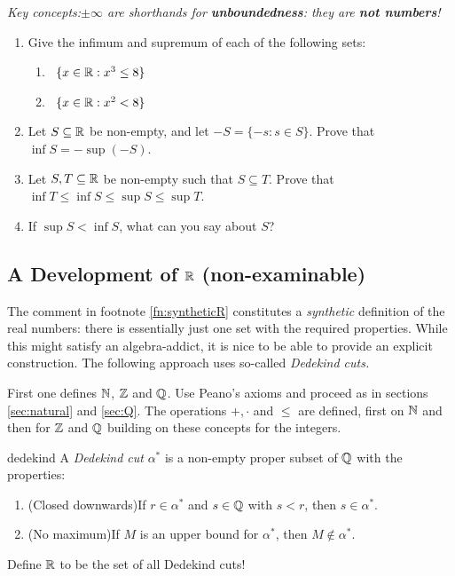 \begin{exercises}{}{}
	\emph{Key concepts:\quad $\pm\infty$ are shorthands for \textbf{unboundedness}: they are \textbf{not numbers}!}
	
	\begin{enumerate}
	  \item Give the infimum and supremum of each of the following sets:
	  \begin{enumerate}
	    \item {} \ $\{x\in\mathbb{R}:x^3\le 8\}$
	    \setcounter{enumii}{2}
	    \item {} \ $\{x\in\mathbb{R}:x^2<8\}$
	  \end{enumerate}
	  
	
	  \item%
	  Let $S\subseteq\mathbb{R}$ be non-empty, and let $-S=\{-s:s\in S\}$. Prove that $\inf S=-\sup(-S)$.
	
	
	  \item%
	  Let $S,T\subseteq\mathbb{R}$ be non-empty such that $S\subseteq T$. Prove that $\inf T\le \inf S\le \sup S\le\sup T$.
	  
	  \item If $\sup S<\inf S$, what can you say about $S$?
	  
	\end{enumerate}
\end{exercises}


\clearpage


\subsection[A Development of R]{A Development of $\mathbb{R}$ (non-examinable)}\label{sec:dedekind}

The comment in footnote \ref{fn:syntheticR} constitutes a \emph{synthetic} definition of the real numbers: there is essentially just one set with the required properties. While this might satisfy an algebra-addict, it is nice to be able to provide an explicit construction. The following approach uses so-called \emph{Dedekind cuts.}\medbreak

First one defines $\mathbb{N}$, $\mathbb{Z}$ and $\mathbb{Q}$. Use Peano's axioms and proceed as in sections \ref{sec:natural} and \ref{sec:Q}. The operations $+,\cdot$ and $\le$ are defined, first on $\mathbb{N}$ and then for $\mathbb{Z}$ and $\mathbb{Q}$ building on these concepts for the integers.

\begin{defn}{}{dedekind}
	A \emph{Dedekind cut} $\alpha^*$ is a non-empty proper subset of $\mathbb{Q}$ with the properties:
	\begin{enumerate}
  	\item (Closed downwards)\lstsp If $r\in\alpha^*$ and $s\in\mathbb{Q}$ with $s<r$, then $s\in\alpha^*$.
  	\item (No maximum)\lstsp If $M$ is an upper bound for $\alpha^*$, then $M\not\in\alpha^*$.
	\end{enumerate}
	Define $\mathbb{R}$ to be the set of all Dedekind cuts!
\end{defn}

